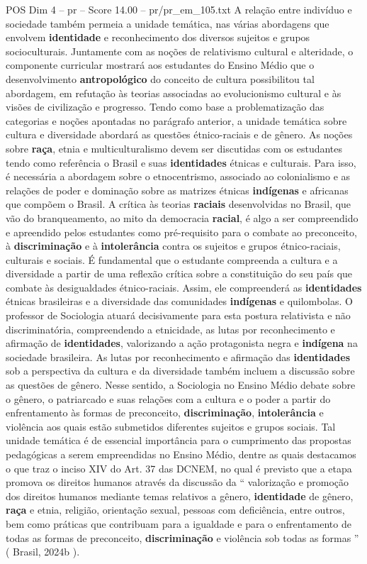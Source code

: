 \begin{textsample}{POS Dim 4 – pr – Score 14.00 – pr/pr\_em\_105.txt}
A relação entre indivíduo e sociedade também permeia a unidade temática, nas várias abordagens que envolvem \textbf{identidade} e reconhecimento dos diversos sujeitos e grupos socioculturais.
Juntamente com as noções de relativismo cultural e alteridade, o componente curricular mostrará aos estudantes do Ensino Médio que o desenvolvimento \textbf{antropológico} do conceito de cultura possibilitou tal abordagem, em refutação às teorias associadas ao evolucionismo cultural e às visões de civilização e progresso.
Tendo como base a problematização das categorias e noções apontadas no parágrafo anterior, a unidade temática sobre cultura e diversidade abordará as questões étnico-raciais e de gênero.
As noções sobre \textbf{raça}, etnia e multiculturalismo devem ser discutidas com os estudantes tendo como referência o Brasil e suas \textbf{identidades} étnicas e culturais.
Para isso, é necessária a abordagem sobre o etnocentrismo, associado ao colonialismo e as relações de poder e dominação sobre as matrizes étnicas \textbf{indígenas} e africanas que compõem o Brasil.
A crítica às teorias \textbf{raciais} desenvolvidas no Brasil, que vão do branqueamento, ao mito da democracia \textbf{racial}, é algo a ser compreendido e apreendido pelos estudantes como pré-requisito para o combate ao preconceito, à \textbf{discriminação} e à \textbf{intolerância} contra os sujeitos e grupos étnico-raciais, culturais e sociais.
É fundamental que o estudante compreenda a cultura e a diversidade a partir de uma reflexão crítica sobre a constituição do seu país que combate às desigualdades étnico-raciais.
Assim, ele compreenderá as \textbf{identidades} étnicas brasileiras e a diversidade das comunidades \textbf{indígenas} e quilombolas.
O professor de Sociologia atuará decisivamente para esta postura relativista e não discriminatória, compreendendo a etnicidade, as lutas por reconhecimento e afirmação de \textbf{identidades}, valorizando a ação protagonista negra e \textbf{indígena} na sociedade brasileira.
As lutas por reconhecimento e afirmação das \textbf{identidades} sob a perspectiva da cultura e da diversidade também incluem a discussão sobre as questões de gênero.
Nesse sentido, a Sociologia no Ensino Médio debate sobre o gênero, o patriarcado e suas relações com a cultura e o poder a partir do enfrentamento às formas de preconceito, \textbf{discriminação}, \textbf{intolerância} e violência aos quais estão submetidos diferentes sujeitos e grupos sociais.
Tal unidade temática é de essencial importância para o cumprimento das propostas pedagógicas a serem empreendidas no Ensino Médio, dentre as quais destacamos o que traz o inciso XIV do Art. 37 das DCNEM, no qual é previsto que a etapa promova os direitos humanos através da discussão da “ valorização e promoção dos direitos humanos mediante temas relativos a gênero, \textbf{identidade} de gênero, \textbf{raça} e etnia, religião, orientação sexual, pessoas com deficiência, entre outros, bem como práticas que contribuam para a igualdade e para o enfrentamento de todas as formas de preconceito, \textbf{discriminação} e violência sob todas as formas ” ( Brasil, 2024b ).

\end{textsample}
